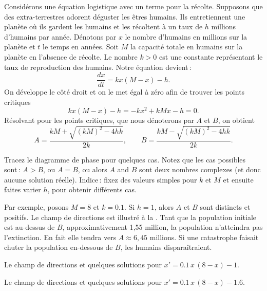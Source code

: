 \medskip
Considérons une équation logistique avec un terme pour la  récolte.
Supposons que des extra-terrestres adorent déguster les êtres humains.  Ils entretiennent une planète où ils gardent les humains et les récoltent à un taux de $h$ millions d'humains par année.  Dénotons par $x$
le nombre d'humains en millions sur la planète et $t$ le temps en années. Soit $M$ la capacité totale en humains sur la planète en l'absence de récolte.  Le nombre $k > 0$ est une constante représentant le taux de reproduction des humains.
Notre équation devient\,: 
\begin{equation*}
\frac{dx}{dt} = kx(M-x) - h .
\end{equation*}
On développe le côté droit et on le met égal à zéro afin de trouver les points critiques
\begin{equation*}
kx(M-x) - h = -kx^2+kMx - h  = 0.
\end{equation*}
Résolvant pour les points critiques, que nous dénoterons par $A$ et $B$, on obtient 
\begin{equation*}
A = \frac{kM + \sqrt{{(kM)}^2 - 4hk}}{2k}, \qquad
B = \frac{kM - \sqrt{{(kM)}^2 - 4hk}}{2k} .
\end{equation*}

\begin{exercise}
Tracez le diagramme de phase pour quelques cas.  Notez que les cas possibles sont\,: 
$A > B$, ou $A=B$, ou alors $A$ and $B$ sont deux nombres complexes (et donc aucune solution réelle).
Indice\,: fixez des valeurs simples pour $k$ et $M$ et ensuite faites varier $h$, pour obtenir différents cas.
\end{exercise}

Par exemple, posons $M=8$ et $k=0.1$.
Si $h=1$, alors $A$ et $B$ sont distincts et positifs.
Le champ de directions est illustré à la .  Tant que la population initiale est au-dessus de $B$,  approximativement 1,55 million, la population n'atteindra pas l'extinction.  En fait elle tendra vers $A \approx
6,45$ millions. Si une catastrophe faisait chuter la population en-dessous de $B$,
les humains disparaîtraient.

\begin{myfig}
\parbox[t]{3.0in}{
 \capstart
 \caption{Le champ de directions et quelques solutions pour
 $x' = 0.1\,x\,(8-x)-1$.\label{2.2:harv1}}
}
\quad
\parbox[t]{3.0in}{
 \capstart
 \caption{Le champ de directions et quelques solutions pour
 $x' = 0.1\,x\,(8-x)-1.6$.\label{2.2:harvc}}
}
\end{myfig}

